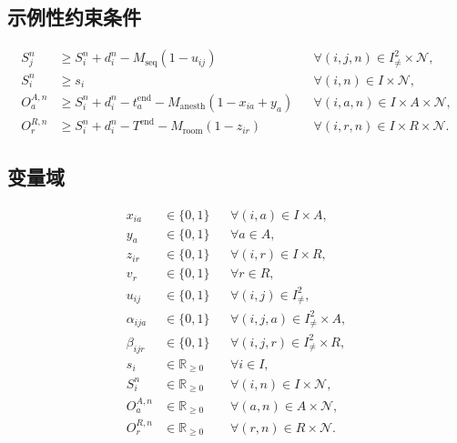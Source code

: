 \documentclass[11pt,a4paper]{article}
\begin{document}
\subsection*{示例性约束条件}
\begin{align}
S_j^n&\geq S_i^n+d_i^n-M_{\mathrm{seq}}(1-u_{ij})
&&\forall (i,j,n)\in I^2_{\ne}\times\mathcal{N},\\
S_i^n&\geq s_i
&&\forall (i,n)\in I\times\mathcal{N},\\
O_a^{A,n}&\geq S_i^n+d_i^n-t_a^{\mathrm{end}}
-M_{\mathrm{anesth}}(1-x_{ia}+y_a)
&&\forall (i,a,n)\in I\times A\times\mathcal{N},\\
O_r^{R,n}&\geq S_i^n+d_i^n-T^{\mathrm{end}}
-M_{\mathrm{room}}(1-z_{ir})
&&\forall (i,r,n)\in I\times R\times\mathcal{N}.
\end{align}

\subsection*{变量域}
\begin{align}
x_{ia}&\in\{0,1\} &&\forall (i,a)\in I\times A,\\
y_a&\in\{0,1\} &&\forall a\in A,\\
z_{ir}&\in\{0,1\} &&\forall (i,r)\in I\times R,\\
v_r&\in\{0,1\} &&\forall r\in R,\\
u_{ij}&\in\{0,1\} &&\forall (i,j)\in I^2_{\ne},\\
\alpha_{ija}&\in\{0,1\} &&\forall (i,j,a)\in I^2_{\ne}\times A,\\
\beta_{ijr}&\in\{0,1\} &&\forall (i,j,r)\in I^2_{\ne}\times R,\\
s_i&\in\mathbb{R}_{\geq0} &&\forall i\in I,\\
S_i^n&\in\mathbb{R}_{\geq0} &&\forall (i,n)\in I\times\mathcal{N},\\
O_a^{A,n}&\in\mathbb{R}_{\geq0} &&\forall (a,n)\in A\times\mathcal{N},\\
O_r^{R,n}&\in\mathbb{R}_{\geq0} &&\forall (r,n)\in R\times\mathcal{N}.
\end{align}
\end{document}
